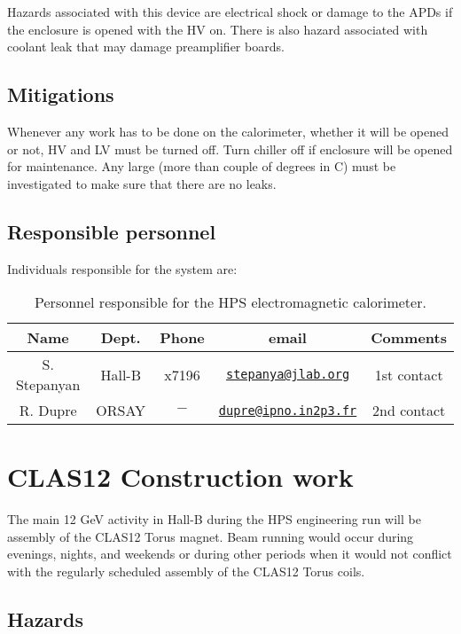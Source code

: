 \documentclass[11pt]{report}
\begin{document}
Hazards associated with this device are electrical shock or damage to the APDs if the enclosure is opened with the  HV on. There is also hazard associated with coolant leak that may damage preamplifier boards.

\subsection{Mitigations}
\indent

Whenever any work has to be done on the calorimeter, whether it will be opened or not, HV and LV must be turned off. Turn chiller off if enclosure will be opened for maintenance. Any large (more than couple of degrees in C) must be investigated to make sure that there are no leaks.   

\subsection{Responsible personnel}
\indent

Individuals responsible for the system are:

\begin{table}[!htb]
 \centering
 \begin{tabular}{|c|c|c|c|c|}
\hline
 Name&Dept.&Phone&email&Comments \\ \hline
 S. Stepanyan & Hall-B&x7196&\href{mailto:stepanya@jlab.org}{\nolinkurl{stepanya@jlab.org}}&1st contact \\ \hline
 R. Dupre & ORSAY&$-$&\href{mailto:dupre@ipno.in2p3.fr}{\nolinkurl{dupre@ipno.in2p3.fr}}& 2nd contact  \\ \hline
 \end{tabular}
\caption{Personnel responsible for the HPS electromagnetic calorimeter.} 
\label{tb:ecal}
\end{table}

\section{CLAS12 Construction work}
\indent

The main 12 GeV activity in Hall-B during the HPS engineering run will be assembly of the CLAS12 Torus magnet. Beam running would occur during evenings, nights, and weekends or during other periods when it would not conflict with the regularly scheduled assembly of the CLAS12 Torus coils.

\subsection{Hazards} 
\indent
\end{document}
